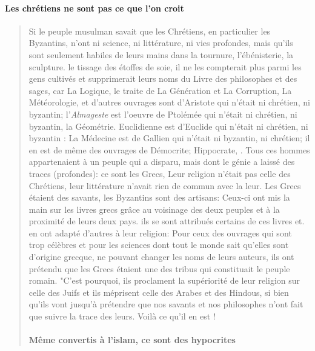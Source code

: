     
\paragraph{Les chrétiens ne sont pas ce que l'on croit}
\begin{quote}
Si le peuple musulman savait que les Chrétiens, en particulier les Byzantins, n'ont ni science, ni littérature, ni vies profondes, mais qu'ils sont seulement habiles de leurs mains dans la tournure, l'ébénisterie, la sculpture. le tissage des étoffes de soie, il ne les compterait plus parmi les gens cultivés et supprimerait leurs noms du Livre des philosophes et des sages, car La Logique, le traite de La Génération et La Corruption, La Météorologie, et d'autres ouvrages sont d'Aristote qui n'était ni chrétien, ni byzantin; l'\textit{Almageste} est l'oeuvre de Ptolémée qui n'était ni chrétien, ni byzantin, la Géométrie. Euclidienne est d'Euclide qui n'était ni chrétien, ni byzantin : La Médecine est de Gallien qui n'était ni byzantin, ni chrétien; il en est de même des ouvrages de Démocrite; Hippocrate, . Tous ces hommes appartenaient à un peuple qui a disparu, mais dont le génie a laissé des traces (profondes): ce sont les Grecs, Leur religion n'était pas celle des Chrétiens, leur littérature n'avait rien de commun avec la leur. Les Grecs étaient des savants, les Byzantins sont des artisans: Ceux-ci ont mis la main sur les livres grecs grâce au voisinage des deux peuples et à la proximité de leurs deux pays. ils se sont attribués certains de ces livres et. en ont adapté d'autres à leur religion: Pour ceux des ouvrages qui sont trop célèbres et pour les sciences dont tout   le monde sait qu'elles sont d'origine grecque, ne pouvant changer les noms de leurs auteurs, ils ont prétendu que les Grecs étaient une des tribus qui constituait le peuple romain.
"C'est pourquoi, ils proclament la supériorité de leur religion sur celle des Juifs et ils méprisent celle des Arabes et des Hindous, si bien qu'ils vont jusqu'à prétendre que nos savants et nos philosophes n'ont fait que suivre la trace des leurs. Voilà ce qu'il en est !

\paragraph{Même convertis à l'islam, ce sont des hypocrites}



\end{quote}
